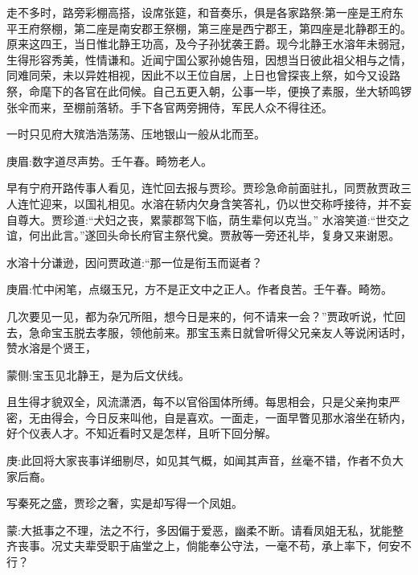 \begin{parag}
    走不多时，路旁彩棚高搭，设席张筵，和音奏乐，俱是各家路祭:第一座是王府东平王府祭棚，第二座是南安郡王祭棚，第三座是西宁郡王，第四座是北静郡王的。原来这四王，当日惟北静王功高，及今子孙犹袭王爵。现今北静王水溶年未弱冠，生得形容秀美，性情谦和。近闻宁国公冢孙媳告殂，因想当日彼此祖父相与之情，同难同荣，未以异姓相视，因此不以王位自居，上日也曾探丧上祭，如今又设路祭，命麾下的各官在此伺候。自己五更入朝，公事一毕，便换了素服，坐大轿鸣锣张伞而来，至棚前落轿。手下各官两旁拥侍，军民人众不得往还。
\end{parag}


\begin{parag}
    一时只见府大殡浩浩荡荡、压地银山一般从北而至。\begin{note}庚眉:数字道尽声势。壬午春。畸笏老人。\end{note}早有宁府开路传事人看见，连忙回去报与贾珍。贾珍急命前面驻扎，同贾赦贾政三人连忙迎来，以国礼相见。水溶在轿内欠身含笑答礼，仍以世交称呼接待，并不妄自尊大。贾珍道:“犬妇之丧，累蒙郡驾下临，荫生辈何以克当。” 水溶笑道:“世交之谊，何出此言。”遂回头命长府官主祭代奠。贾赦等一旁还礼毕，复身又来谢恩。
\end{parag}


\begin{parag}
    水溶十分谦逊，因问贾政道:“那一位是衔玉而诞者？\begin{note}庚眉:忙中闲笔，点缀玉兄，方不是正文中之正人。作者良苦。壬午春。畸笏。\end{note}几次要见一见，都为杂冗所阻，想今日是来的，何不请来一会？”贾政听说，忙回去，急命宝玉脱去孝服，领他前来。那宝玉素日就曾听得父兄亲友人等说闲话时，赞水溶是个贤王，\begin{note}蒙侧:宝玉见北静王，是为后文伏线。\end{note}且生得才貌双全，风流潇洒，每不以官俗国体所缚。每思相会，只是父亲拘束严密，无由得会，今日反来叫他，自是喜欢。一面走，一面早瞥见那水溶坐在轿内，好个仪表人才。不知近看时又是怎样，且听下回分解。
\end{parag}


\begin{parag}
    \begin{note}庚:此回将大家丧事详细剔尽，如见其气概，如闻其声音，丝毫不错，作者不负大家后裔。\end{note}
\end{parag}


\begin{parag}
    \begin{note}写秦死之盛，贾珍之奢，实是却写得一个凤姐。\end{note}
\end{parag}


\begin{parag}
    \begin{note}蒙:大抵事之不理，法之不行，多因偏于爱恶，幽柔不断。请看凤姐无私，犹能整齐丧事。况丈夫辈受职于庙堂之上，倘能奉公守法，一毫不苟，承上率下，何安不行？\end{note}
\end{parag}